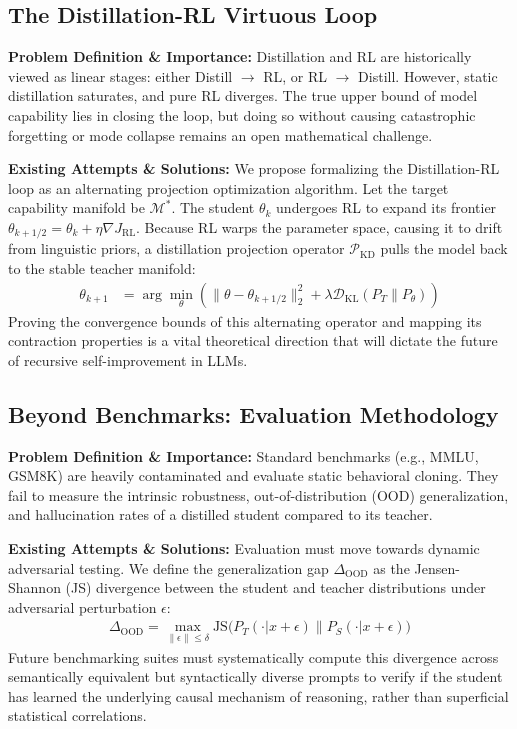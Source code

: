 \subsection{The Distillation-RL Virtuous Loop}
\textbf{Problem Definition \& Importance:} Distillation and RL are historically viewed as linear stages: either Distill $\to$ RL, or RL $\to$ Distill. However, static distillation saturates, and pure RL diverges. The true upper bound of model capability lies in closing the loop, but doing so without causing catastrophic forgetting or mode collapse remains an open mathematical challenge.

\textbf{Existing Attempts \& Solutions:} We propose formalizing the Distillation-RL loop as an alternating projection optimization algorithm. Let the target capability manifold be $\mathcal{M}^*$. The student $\theta_k$ undergoes RL to expand its frontier $\theta_{k+1/2} = \theta_k + \eta \nabla J_{\text{RL}}$. Because RL warps the parameter space, causing it to drift from linguistic priors, a distillation projection operator $\mathcal{P}_{\text{KD}}$ pulls the model back to the stable teacher manifold:
\begin{align}
\theta_{k+1} &= \arg\min_{\theta} \left( \parallel \theta - \theta_{k+1/2} \parallel_2^2 + \lambda \mathcal{D}_{\text{KL}}(P_T \parallel P_\theta) \right)
\end{align}
Proving the convergence bounds of this alternating operator and mapping its contraction properties is a vital theoretical direction that will dictate the future of recursive self-improvement in LLMs.

\subsection{Beyond Benchmarks: Evaluation Methodology}
\textbf{Problem Definition \& Importance:} Standard benchmarks (e.g., MMLU, GSM8K) are heavily contaminated and evaluate static behavioral cloning. They fail to measure the intrinsic robustness, out-of-distribution (OOD) generalization, and hallucination rates of a distilled student compared to its teacher.

\textbf{Existing Attempts \& Solutions:} Evaluation must move towards dynamic adversarial testing. We define the generalization gap $\Delta_{\text{OOD}}$ as the Jensen-Shannon (JS) divergence between the student and teacher distributions under adversarial perturbation $\epsilon$:
\begin{align}
\Delta_{\text{OOD}} = \max_{\parallel \epsilon \parallel \le \delta} \text{JS}\Big( P_T(\cdot | x + \epsilon) \parallel P_S(\cdot | x + \epsilon) \Big)
\end{align}
Future benchmarking suites must systematically compute this divergence across semantically equivalent but syntactically diverse prompts to verify if the student has learned the underlying causal mechanism of reasoning, rather than superficial statistical correlations.

